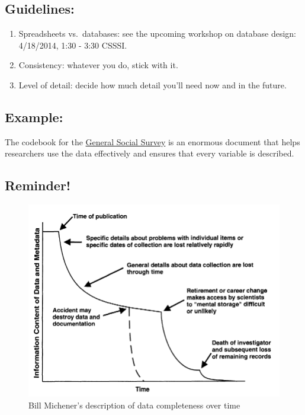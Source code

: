 \documentclass[]{article}
\begin{document}
\subsection{Guidelines:}\label{guidelines}

\begin{enumerate}
\def\labelenumi{\arabic{enumi}.}
\itemsep1pt\parskip0pt
\item
  Spreadsheets vs.~databases: see the upcoming workshop on database
  design: 4/18/2014, 1:30 - 3:30 CSSSI.
\item
  Consistency: whatever you do, stick with it.
\item
  Level of detail: decide how much detail you'll need now and in the
  future.
\end{enumerate}

\subsection{Example:}\label{example}

The codebook for the \href{http://www3.norc.org/GSS+Website/}{General
Social Survey} is an enormous document that helps researchers use the
data effectively and ensures that every variable is described.

\subsection{Reminder!}\label{reminder}

\begin{figure}[htbp]
\centering
\includegraphics{death.png}
\caption{Bill Michener's description of data completeness over time}
\end{figure}
\end{document}
